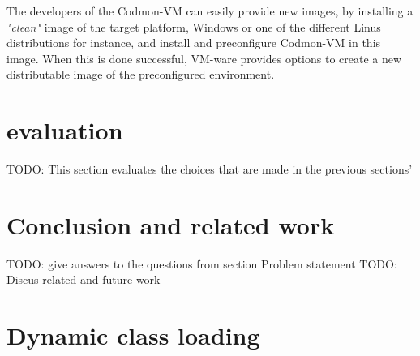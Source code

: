 \documentclass{article}
\newcommand{\project}{Codmon-VM}
\begin{document}
\noindent The developers of the \project{} can easily provide new images, by installing a \emph{"clean"} image of the target platform, Windows or one of the different Linus distributions for instance, and 
install and preconfigure \project{} in this image. When this is done successful, VM-ware provides options to create a new distributable image of the preconfigured environment. 

\newpage
\section{evaluation}
\label{sec:evaluation}
TODO: This section evaluates the choices that are made in the previous sections'

\newpage
\section{Conclusion and related work}
\label{sec:conclusion}
TODO: give answers to the questions from section Problem statement
TODO: Discus related and future work
\newpage


\newpage
\appendix
\section{Dynamic class loading}
\label{AppendixA}
\end{document}
